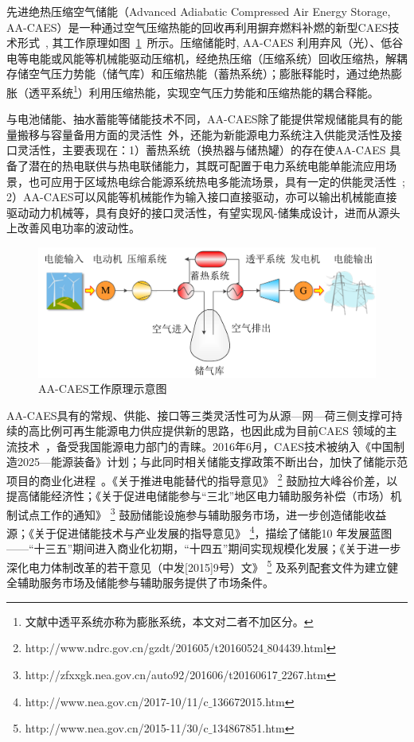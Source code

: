 先进绝热压缩空气储能（Advanced Adiabatic Compressed Air Energy Storage, AA-CAES）是一种通过空气压缩热能的回收再利用摒弃燃料补燃的新型CAES技术形式~\cite{ACAES-Green-12}, 其工作原理如图~\ref{fig:AA-CAES-principle-abs}~所示。压缩储能时, AA-CAES 利用弃风（光）、低谷电等电能或风能等机械能驱动压缩机，经绝热压缩（压缩系统）回收压缩热，解耦存储空气压力势能（储气库）和压缩热能（蓄热系统）；膨胀释能时，通过绝热膨胀（透平系统\footnote{文献中透平系统亦称为膨胀系统，本文对二者不加区分。}）利用压缩热能，实现空气压力势能和压缩热能的耦合释能\cite{CAES-Review-18-Rui-operation}。

与电池储能、抽水蓄能等储能技术不同，AA-CAES除了能提供常规储能具有的能量搬移与容量备用方面的灵活性~\cite{CAES-Baseload-Review-12,CAES-Reserve-11}外，还能为新能源电力系统注入供能灵活性及接口灵活性，主要表现在：1）蓄热系统（换热器与储热罐）的存在使AA-CAES 具备了潜在的热电联供与热电联储能力，其既可配置于电力系统电能单能流应用场景，也可应用于区域热电综合能源系统热电多能流场景，具有一定的供能灵活性~\cite{CAES-Review-18-Rui-operation,CAES-Review-16-Polygeneration}; 2）AA-CAES可以风能等机械能作为输入接口直接驱动，亦可以输出机械能直接驱动动力机械等，具有良好的接口灵活性，有望实现风-储集成设计，进而从源头上改善风电功率的波动性。

\begin{figure}[H] %
  \centering
  \includegraphics[scale=0.60]{figures/Chap1-1-AA-CAES-Principle-Abs.pdf}
  \caption{AA-CAES工作原理示意图}
  \label{fig:AA-CAES-principle-abs}
\end{figure}

AA-CAES具有的常规、供能、接口等三类灵活性可为从源—网—荷三侧支撑可持续的高比例可再生能源电力供应提供新的思路，也因此成为目前CAES 领域的主流技术~\cite{AA-CAES-04,AA-CAES-07}，备受我国能源电力部门的青睐。2016年6月，CAES技术被纳入《中国制造2025—能源装备》计划；与此同时相关储能支撑政策不断出台，加快了储能示范项目的商业化进程~\cite{ESS-CESA-16,ESS-CIAPS-16,CAES-Review-18-Rui-operation}。《关于推进电能替代的指导意见》
\footnote{http://www.ndrc.gov.cn/gzdt/201605/t20160524$\_$804439.html} 鼓励拉大峰谷价差，以提高储能经济性；《关于促进电储能参与“三北”地区电力辅助服务补偿（市场）机制试点工作的通知》
\footnote{http://zfxxgk.nea.gov.cn/auto92/201606/t20160617$\_$2267.htm} 鼓励储能设施参与辅助服务市场，进一步创造储能收益源；《关于促进储能技术与产业发展的指导意见》
\footnote{http://www.nea.gov.cn/2017-10/11/c$\_$136672015.htm}，描绘了储能10 年发展蓝图——“十三五”期间进入商业化初期，“十四五”期间实现规模化发展；《关于进一步深化电力体制改革的若干意见（中发[2015]9号）文》
\footnote{http://www.nea.gov.cn/2015-11/30/c$\_$134867851.htm} 及系列配套文件为建立健全辅助服务市场及储能参与辅助服务提供了市场条件\cite{CAES-Review-18-Rui-operation}。

